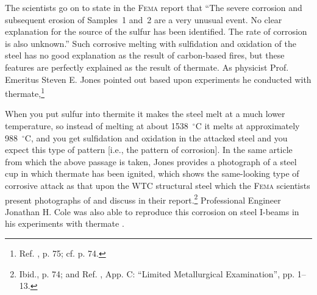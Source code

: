 \documentclass[letterpaper,12pt]{article}
\newenvironment{squote}
  {\small\quote}
  {\endquote\normalsize}
\begin{document}
The scientists go on to state in the \textsc{Fema} report that ``The severe corrosion and subsequent erosion of Samples~1 and~2 are a very unusual event. No clear explanation for the source of the sulfur has been identified. The rate of corrosion is also unknown.'' Such corrosive melting with sulfidation and oxidation of the steel has no good explanation as the result of carbon-based fires, but these features are perfectly explained as the result of thermate. As physicist Prof. Emeritus Steven E. Jones pointed out based upon experiments he conducted with thermate,\footnote{Ref. , p. 75; cf. p. 74.}

\begin{squote}
When you put sulfur into thermite it makes the steel melt at a much lower temperature, so instead of melting at about 1538~\( ^{\circ}\text{C} \) it melts at approximately 988~\( ^{\circ}\text{C} \), and you get sulfidation and oxidation in the attacked steel and you expect this type of pattern [i.e., the pattern of corrosion].
\end{squote} In the same article from which the above passage is taken, Jones provides a photograph of a steel cup in which thermate has been ignited, which shows the same-looking type of corrosive attack as that upon the WTC structural steel which the \textsc{Fema} scientists present photographs of and discuss in their report.\footnote{Ibid., p. 74; and Ref. , App. C: ``Limited Metallurgical Examination'', pp. 1--13.} Professional Engineer Jonathan H. Cole was also able to reproduce this corrosion on steel I-beams in his experiments with thermate \cite{Cole2010-11-10}.
\end{document}
